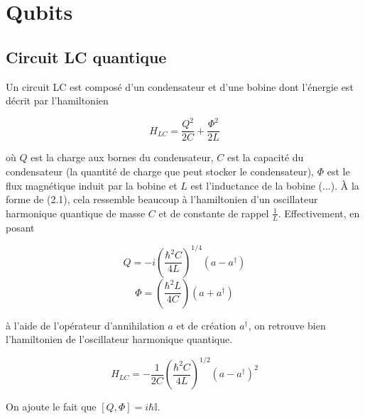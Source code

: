 \section{Qubits}
\subsection{Circuit LC quantique}
Un circuit LC est composé d'un condensateur et d'une bobine dont l'énergie est décrit par l'hamiltonien

\begin{equation}
    H_{LC} = \frac{Q^2}{2C} + \frac{\Phi^2}{2L} 
\end{equation}

où $Q$ est la charge aux bornes du condensateur, $C$ est la capacité du condensateur (la quantité de charge que peut stocker le condensateur), $\Phi$ est le flux magnétique induit par la bobine et $L$ est l'inductance de la bobine (...). À la forme de (2.1), cela ressemble beaucoup à l'hamiltonien d'un oscillateur harmonique quantique de masse $C$ et de constante de rappel $\frac{1}{L}$. Effectivement, en posant

\begin{equation*}
    Q = -i\left(\frac{\hbar^2C}{4L}\right)^{1/4}(a - a^\dagger)
\end{equation*}
\begin{equation*}
    \Phi = \left(\frac{\hbar^2L}{4C}\right)(a+a^\dagger)
\end{equation*}

à l'aide de l'opérateur d'annihilation $a$ et de création $a^\dagger$, on retrouve bien l'hamiltonien de l'oscillateur harmonique quantique. 

\begin{equation*}
    H_{LC} = -\frac{1}{2C}\left(\frac{\hbar^2C}{4L}\right)^{1/2}(a - a^\dagger)^2 
\end{equation*}



On ajoute le fait que $\left[Q, \Phi\right] = i\hbar \mathbb{I}$.

